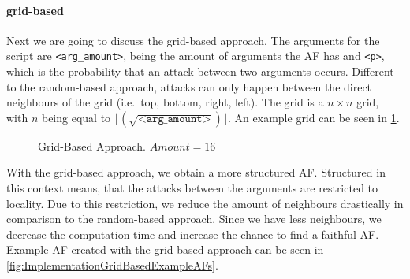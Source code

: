 \paragraph{grid-based} Next we are going to discuss the grid-based approach. The arguments for the script are \texttt{<arg\_amount>}, being the amount of arguments the AF has and \texttt{<p>}, which is the probability that an attack between two arguments occurs. Different to the random-based approach, attacks can only happen between the direct neighbours of the grid (i.e.\ top, bottom, right, left). The grid is a $n \times n$ grid, with $n$ being equal to $\lfloor (\sqrt{\texttt{<arg\_amount>}}) \rfloor$. An example grid can be seen in \cref{fig:GridBasedApproach}.

\begin{figure}[h!]
    \centering
    \caption{Grid-Based Approach. $Amount=16$}
    \label{fig:GridBasedApproach}
\end{figure}

With the grid-based approach, we obtain a more structured AF. Structured in this context means, that the attacks between the arguments are restricted to locality. Due to this restriction, we reduce the amount of neighbours drastically in comparison to the random-based approach. Since we have less neighbours, we decrease the computation time and increase the chance to find a faithful AF. Example AF created with the grid-based approach can be seen in \cref{fig:ImplementationGridBasedExampleAFs}.



